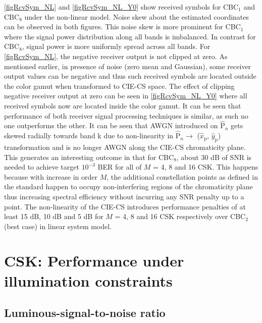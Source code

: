 \documentclass[10pt,letterpaper]{article}
\begin{document}
\figurename{ }\ref{figRcvSym_NL} and \figurename{ }\ref{figRcvSym_NL_Y0} show received symbols for CBC$_{1}$ and CBC$_{8}$ under the non-linear model. Noise skew about the estimated coordinates can be observed in both figures. This noise skew is more prominent for CBC$_{1}$ where the signal power distribution along all bands is imbalanced. In contrast for CBC$_{8}$, signal power is more uniformly spread across all bands. For \figurename{ }\ref{figRcvSym_NL}, the negative receiver output is not clipped at zero. As mentioned earlier, in presence of noise (zero mean and Gaussian), some receiver output values can be negative and thus such received symbols are located outside the color gamut when transformed to CIE-CS space. The effect of clipping negative receiver output at zero can be seen in \figurename{ }\ref{figRcvSym_NL_Y0} where all received symbols now are located inside the color gamut. It can be seen that performance of both receiver signal processing techniques is similar, as such no one outperforms the other. It can be seen that AWGN introduced on $\hat{\text{P}}_{n}$ gets skewed radially towards band k due to non-linearity in $\hat{\text{P}}_{n}\rightarrow$ ($\hat{x}_{\text{p}}$, $\hat{y}_{\text{p}}$) transformation and is no longer AWGN along the CIE-CS chromaticity plane. This generates an interesting outcome in that for CBC$_{8}$, about 30 dB of SNR is needed to achieve target $10^{-3}$ BER for all of $M$ = 4, 8 and 16 CSK. This happens because with increase in order $M$, the additional constellation points as defined in the standard happen to occupy non-interfering regions of the chromaticity plane thus increasing spectral efficiency without incurring any SNR penalty up to a point. The non-linearity of the CIE-CS introduces performance penalties of at least 15 dB, 10 dB and 5 dB for $M$ = 4, 8 and 16 CSK respectively over CBC$_{2}$ (best case) in linear system model. 

\section{CSK: Performance under illumination constraints}\label{sCSKLSNR}

\subsection{Luminous-signal-to-noise ratio}\label{ssLSNR}
\end{document}
